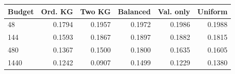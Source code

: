 \begin{tabular}{lrrrrr}
\toprule
Budget & Ord. KG & Two KG & Balanced & Val. only & Uniform \\
\midrule
48 & 0.1794 & 0.1957 & 0.1972 & 0.1986 & 0.1988 \\
144 & 0.1593 & 0.1867 & 0.1897 & 0.1882 & 0.1815 \\
480 & 0.1367 & 0.1500 & 0.1800 & 0.1635 & 0.1605 \\
1440 & 0.1242 & 0.0907 & 0.1499 & 0.1229 & 0.1380 \\
\bottomrule
\end{tabular}
